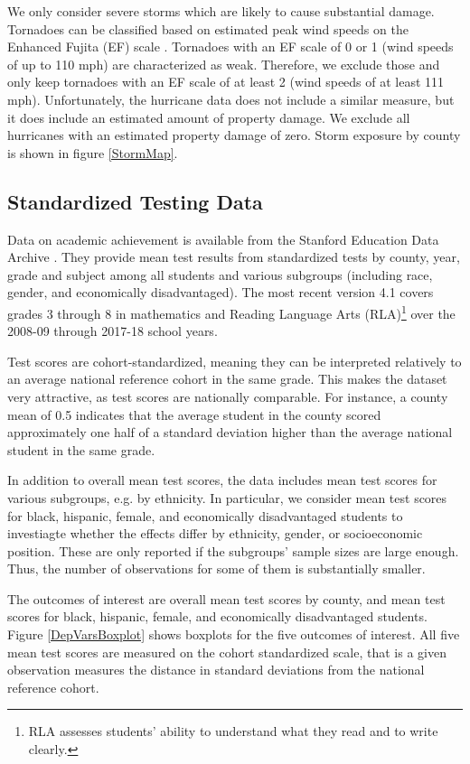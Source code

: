 We only consider severe storms which are likely to cause substantial damage. Tornadoes can be classified based on estimated peak wind speeds on the Enhanced Fujita (EF) scale \citep[for more details see][]{EF_Scale}. Tornadoes with an EF scale of 0 or 1 (wind speeds of up to 110 mph) are characterized as weak. Therefore, we exclude those and only keep tornadoes with an EF scale of at least 2 (wind speeds of at least 111 mph). Unfortunately, the hurricane data does not include a similar measure, but it does include an estimated amount of property damage. We exclude all hurricanes with an estimated property damage of zero.  Storm exposure by county is shown in figure \ref{StormMap}.


\subsection{Standardized Testing Data}

Data on academic achievement is available from the Stanford Education Data Archive \citep{SEDA}. They provide mean test results from standardized tests by county, year, grade and subject among all students and various subgroups (including race, gender, and economically disadvantaged). The most recent version 4.1 covers grades 3 through 8 in mathematics and Reading Language Arts (RLA)\footnote{RLA assesses students' ability to understand what they read and to write clearly.} over the 2008-09 through 2017-18 school years.

Test scores are cohort-standardized, meaning they can be interpreted relatively to an average national reference cohort in the same grade. This makes the dataset very attractive, as test scores are nationally comparable. For instance, a county mean of 0.5 indicates that the average student in the county scored approximately one half of a standard deviation higher than the average national student in the same grade.

In addition to overall mean test scores, the data includes mean test scores for various subgroups, e.g. by ethnicity. In particular, we consider mean test scores for black, hispanic, female, and economically disadvantaged students to investiagte whether the effects differ by ethnicity, gender, or socioeconomic position. These are only reported if the subgroups' sample sizes are large enough. Thus, the number of observations for some of them is substantially smaller.

The outcomes of interest are overall mean test scores by county, and mean test scores for black, hispanic, female, and economically disadvantaged students. Figure \ref{DepVarsBoxplot} shows boxplots for the five outcomes of interest. All five mean test scores are measured on the cohort standardized scale, that is a given observation measures the distance in standard deviations from the national reference cohort. 

